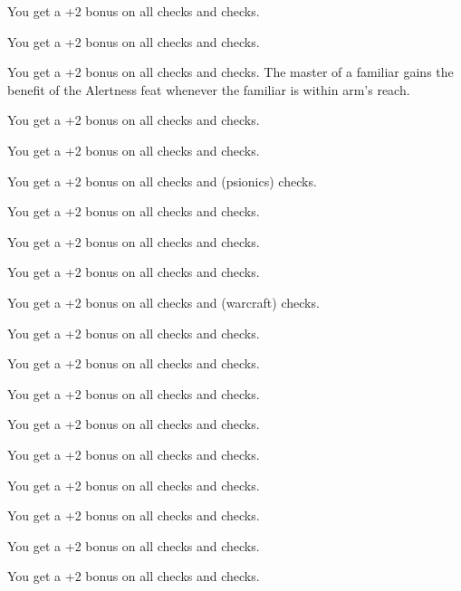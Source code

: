 
{You get a +2 bonus on all  checks and  checks.}

{You get a +2 bonus on all  checks and  checks.}

{You get a +2 bonus on all  checks and  checks.}
{}
{The master of a familiar gains the benefit of the Alertness feat whenever the familiar is within arm's reach.}

{You get a +2 bonus on all  checks and  checks.}

{You get a +2 bonus on all  checks and  checks.}

{You get a +2 bonus on all  checks and  (psionics) checks.}

{You get a +2 bonus on all  checks and  checks.}

{You get a +2 bonus on all  checks and  checks.}

{You get a +2 bonus on all  checks and  checks.}

{You get a +2 bonus on all  checks and  (warcraft) checks.}

{You get a +2 bonus on all  checks and  checks.}

{You get a +2 bonus on all  checks and  checks.}

{You get a +2 bonus on all  checks and  checks.}

{You get a +2 bonus on all  checks and  checks.}

{You get a +2 bonus on all  checks and  checks.}

{You get a +2 bonus on all  checks and  checks.}

{You get a +2 bonus on all  checks and  checks.}

{You get a +2 bonus on all  checks and  checks.}

{You get a +2 bonus on all  checks and  checks.}